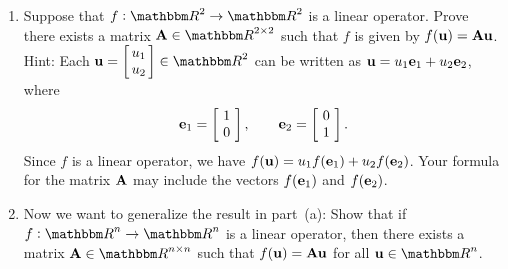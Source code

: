 
\begin{enumerate}
\item Suppose that $f: \R^2 \to \R^2$ is a linear operator. Prove there exists a matrix $\BA\in\R^{2\times 2}$ such that $f$ is given by $f({\bf u}) = {\bf A}{\bf u}$. Hint: Each $\Bu  = \left[\!\!\begin{array}{c} u_1 \\ u_2\end{array}\!\!\right] \in \R^2$ can be written as ${\bf u} = u_1 {\bf e}_1 + u_2 {\bf e}_2$, where
\[
{\bf e}_1 = \left[\!\begin{array}{c} 1 \\ 0\end{array}\!\right], \qquad {\bf e}_2 = \left[\!\begin{array}{c} 0 \\ 1\end{array}\!\right].
\] 
Since $f$ is a linear operator, we have $f({\bf u}) =  u_1 f({\bf e}_1) + u_2 f({\bf e}_2)$. Your formula for the matrix ${\bf A}$ may include the vectors $f({\bf e}_1)$ and $f({\bf e}_2)$.
\\
\item Now we want to generalize the result in part~(a): Show that if $f: \R^n \to \R^n$ is a linear operator, then there exists a matrix $\BA\in\Rnn$ such that $f({\bf u}) = {\bf A}{\bf u}$ for all $\Bu\in\Rn$.
\end{enumerate}



